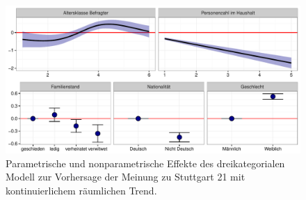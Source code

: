 \documentclass{Vorlage}
\begin{document}
\begin{figure}[h]
 \begin{center}
 \includegraphics[scale=0.8]{Pictures/S21ModelEffects2}
 \caption{Parametrische und nonparametrische Effekte des dreikategorialen Modell zur Vorhersage der Meinung zu Stuttgart 21 mit kontinuierlichem räumlichen Trend.}
 \label{GKParam}
 \end{center}
\end{figure}
\end{document}
